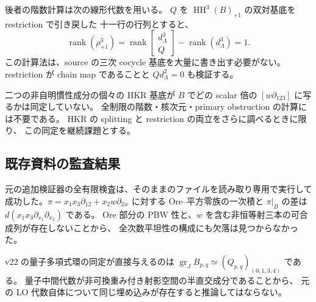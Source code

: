 後者の階数計算は次の線形代数を用いる。
$Q$ を $\operatorname{HH}^3(B)_{+1}$ の双対基底を restriction で引き戻した
十一行の行列とすると、
\[
 \operatorname{rank}(\rho^3_{+1})=
 \operatorname{rank}\begin{bmatrix}d^3_\Lambda\\Q\end{bmatrix}
 -\operatorname{rank}(d^3_\Lambda)=1.
\]
この計算法は、source の三次 cocycle 基底を大量に書き出す必要がない。
restriction が chain map であることと $Qd^2_\Lambda=0$ も検証する。

二つの非自明慣性成分の個々の HKR 基底が $B$ でどの scalar 倍の
$[w\partial_{123}]$ に写るかは同定していない。
全制限の階数・核次元・primary obstruction の計算には不要である。
HKR の splitting と restriction の両立をさらに調べるときに限り、
この同定を継続課題とする。

\subsection{既存資料の監査結果}
元の追加検証器の全有限検査は、そのままのファイルを読み取り専用で実行して
成功した。$\pi=x_1x_3\partial_{12}+x_2w\partial_{2w}$ に対する
Ore--平方零族の一次積と $\pi|_B$ の差は
$d(x_1x_3\partial_{x_1}\partial_{x_2})$ である。
Ore 部分の PBW 性と、$w$ を含む非恒等射三本の可合成列が存在しないことから、
全次数平坦性の構成にも欠落は見つからなかった。

v22 の量子多項式環の同定が直接与えるのは
$\operatorname{gr}_J B_{p,q}\simeq(Q_{p,q})_{(0,1,3,4)}$ である。
量子中間代数が非可換重み付き射影空間の半直交成分であることから、
元の LO 代数自体について同じ埋め込みが存在すると推論してはならない。
